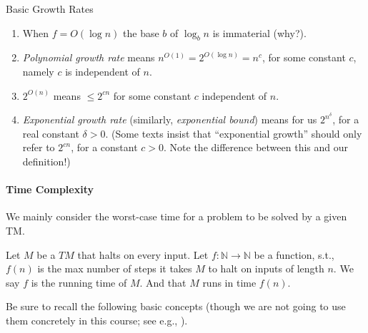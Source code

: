 \begin{trailer}{Basic Growth Rates}
\begin{enumerate}
    \item When $f=O\left(\log n\right)$ the base $b$ of $\log _b n$ is immaterial (why?).
    
    \item \emph{Polynomial growth rate} means $n^{O(1)}=2^{O\left(\log n\right)}=n^c$, for some constant $c$, namely $c$ is independent of $n$.
    
      \item $2^{O(n)}$ means $\leq 2^{c n}$ for some constant $c$ independent of $n$.
    
    \item \emph{Exponential growth rate} (similarly, \emph{exponential bound})  means for us $2^{n^\delta}$, for a real constant $\delta>0$. (Some texts insist that ``exponential growth'' should only refer to $2^{cn}$, for a constant $c>0$. Note the difference between this and our definition!)
\end{enumerate}
\end{trailer}




\paragraph{Time Complexity}
We mainly consider the worst-case time for a problem to be solved by a given TM.

\begin{definition}
    Let $M$ be a $T M$ that halts on every input. Let $f: \mathbb{N} \rightarrow \mathbb{N}$ be a function, s.t., $f(n)$ is the max number  of steps it takes $M$ to halt on inputs of length $n$. We say $f$ is the running time of $M$. And that $M$ runs in time $f(n)$.
\end{definition}




Be sure to recall the following basic concepts   (though we are not going to use them concretely in this course; see e.g., \cite{AB09}).

